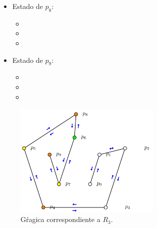 \begin{multicols}{2}
\begin{itemize}
\begin{itemize}
      \item {}
      \end{itemize}

\item Estado de $p_8$:
      \begin{itemize}
      \item {}
      
      \item {}
      
      \item {}
      \end{itemize}

\item Estado de $p_9$:
      \begin{itemize}
      \item {}
      
      \item {}
      
      \item {}
      \end{itemize}

\end{itemize}
\end{multicols} 
\newpage

\begin{figure}[ht]
        \begin{center}
                \includegraphics[width=7cm]{RD3.png}
                \caption{Gŕagica correspondiente a $R_3$.}
        \end{center}
\end{figure}

